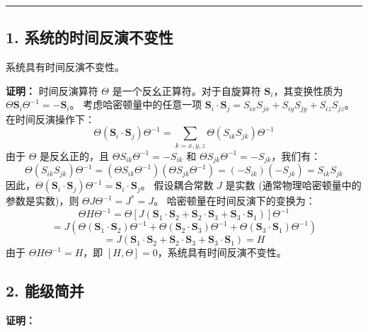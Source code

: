 \documentclass{article}
\begin{document}
\rule[1ex]{\textwidth}{0.4pt}

\subsection*{1. 系统的时间反演不变性}
系统具有时间反演不变性。

\textbf{证明：}
时间反演算符 \(\Theta\) 是一个反幺正算符。对于自旋算符 \(\mathbf{S}_i\)，其变换性质为 \(\Theta \mathbf{S}_i \Theta^{-1} = -\mathbf{S}_i\)。
考虑哈密顿量中的任意一项 \(\mathbf{S}_i \cdot \mathbf{S}_j = S_{ix}S_{jx} + S_{iy}S_{jy} + S_{iz}S_{jz}\)。在时间反演操作下：
\[ \Theta (\mathbf{S}_i \cdot \mathbf{S}_j) \Theta^{-1} = \sum_{k=x,y,z} \Theta (S_{ik} S_{jk}) \Theta^{-1} \]
由于 \(\Theta\) 是反幺正的，且 \(\Theta S_{ik} \Theta^{-1} = -S_{ik}\) 和 \(\Theta S_{jk} \Theta^{-1} = -S_{jk}\)，我们有：
\[ \Theta (S_{ik} S_{jk}) \Theta^{-1} = (\Theta S_{ik} \Theta^{-1}) (\Theta S_{jk} \Theta^{-1}) = (-S_{ik})(-S_{jk}) = S_{ik} S_{jk} \]
因此，\(\Theta (\mathbf{S}_i \cdot \mathbf{S}_j) \Theta^{-1} = \mathbf{S}_i \cdot \mathbf{S}_j\)。
假设耦合常数 \(J\) 是实数 (通常物理哈密顿量中的参数是实数)，则 \(\Theta J \Theta^{-1} = J^* = J\)。
哈密顿量在时间反演下的变换为：
\[ \Theta H \Theta^{-1} = \Theta [J(\mathbf{S}_1 \cdot \mathbf{S}_2 + \mathbf{S}_2 \cdot \mathbf{S}_3 + \mathbf{S}_3 \cdot \mathbf{S}_1)] \Theta^{-1} \]
\[ = J(\Theta (\mathbf{S}_1 \cdot \mathbf{S}_2) \Theta^{-1} + \Theta (\mathbf{S}_2 \cdot \mathbf{S}_3) \Theta^{-1} + \Theta (\mathbf{S}_3 \cdot \mathbf{S}_1) \Theta^{-1}) \]
\[ = J(\mathbf{S}_1 \cdot \mathbf{S}_2 + \mathbf{S}_2 \cdot \mathbf{S}_3 + \mathbf{S}_3 \cdot \mathbf{S}_1) = H \]
由于 \(\Theta H \Theta^{-1} = H\)，即 \([H, \Theta] = 0\)，系统具有时间反演不变性。


\subsection*{2. 能级简并}

\textbf{证明：}
\end{document}
